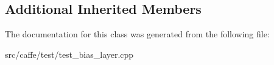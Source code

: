 \subsection*{Additional Inherited Members}


The documentation for this class was generated from the following file\+:\begin{DoxyCompactItemize}
\item 
src/caffe/test/test\+\_\+bias\+\_\+layer.\+cpp\end{DoxyCompactItemize}
